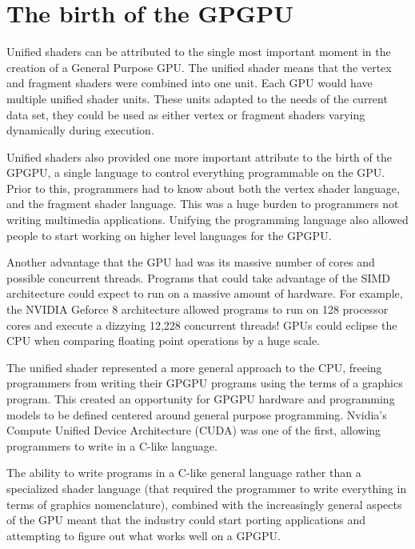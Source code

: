 \section*{The birth of the GPGPU}

Unified shaders can be attributed to the single most important moment in the creation of a General Purpose GPU. The unified shader means that the vertex and fragment shaders were combined into one unit. Each GPU would have multiple unified shader units. These units adapted to the needs of the current data set, they could be used as either vertex or fragment shaders varying dynamically during execution. \cite{emergingtech}

Unified shaders also provided one more important attribute to the birth of the GPGPU, a single language to control everything programmable on the GPU. Prior to this, programmers had to know about both the vertex shader language, and the fragment shader language. This was a huge burden to programmers not writing multimedia applications. Unifying the programming language also allowed people to start working on higher level languages for the GPGPU. \cite{gpucomputing}

Another advantage that the GPU had was its massive number of cores and possible concurrent threads.  Programs that could take advantage of the SIMD architecture could expect to run on a massive amount of hardware. For example, the NVIDIA Geforce 8 architecture allowed programs to run on 128 processor cores and execute a dizzying 12,228 concurrent threads! GPUs could eclipse the CPU when comparing floating point operations by a huge scale. \cite{emergingtech}

The unified shader represented a more general approach to the CPU, freeing programmers from writing their GPGPU programs using the terms of a graphics program. This created an opportunity for GPGPU hardware and programming models to be defined centered around general purpose programming. Nvidia's Compute Unified Device Architecture (CUDA) was one of the first, allowing programmers to write in a C-like language. 

The ability to write programs in a C-like general language rather than a specialized shader language (that required the programmer to write everything in terms of graphics nomenclature), combined with the increasingly general aspects of the GPU meant that the industry could start porting applications and attempting to figure out what works well on a GPGPU. 

